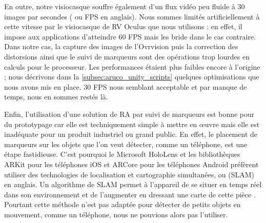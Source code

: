 
En outre, notre visiocasque souffre également d'un flux vidéo peu fluide à 30 images par secondes ( ou FPS en anglais). Nous sommes limités artificiellement à cette vitesse par le visiocasque de RV Oculus que nous utilisons : en effet, il impose aux applications d'atteindre 60 FPS mais les bride dans le cas contraire. Dans notre cas, la capture des images de l'Ovrvision puis la correction des distorsions ainsi que le suivi de marqueurs sont des opérations trop lourdes en calculs pour le processeur. Les performances étaient plus faibles encore à l'origine ; nous décrivons dans la \autoref{subsec:aruco_unity_scripts} quelques optimisations que nous avons mis en place. 30 FPS nous semblant acceptable et par manque de temps, nous en sommes restés là.


Enfin, l'utilisation d'une solution de RA par suivi de marqueurs est bonne pour du prototypage car elle est techniquement simple à mettre en \oe uvre mais elle est inadéquate pour un produit industriel ou grand public. En effet, le placement de marqueurs sur les objets que l'on veut détecter, comme un téléphone, est une étape fastidieuse. C'est pourquoi le Microsoft HoloLens et les bibliothèques ARKit pour les téléphones iOS et ARCore pour les téléphones Android préfèrent utiliser des technologies de localisation et cartographie simultanées, ou  (SLAM) en anglais. Un algorithme de SLAM permet à l'appareil de se situer en temps réel dans son environnement et de l'augmenter en dressant une carte de cette pièce . Pourtant cette méthode n'est pas adaptée pour détecter de petits objets en mouvement, comme un téléphone, nous ne pouvions alors pas l'utiliser.


